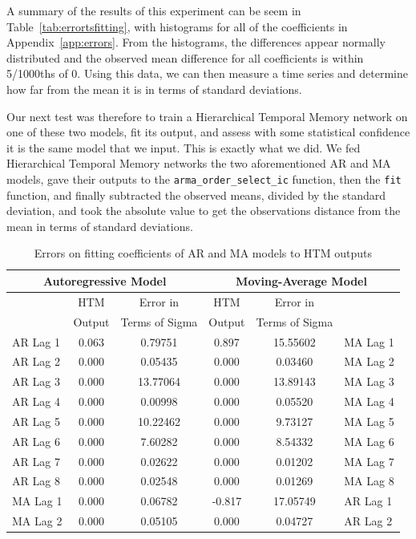 \documentclass[oneside,12pt,openany]{book}
\begin{document}
	A summary of the results of this experiment can be seem in Table~\ref{tab:errortsfitting}, with histograms for all of the coefficients in Appendix~\ref{app:errors}. From the histograms, the differences appear normally distributed and the observed mean difference for all coefficients is within 5/1000ths of 0. Using this data, we can then measure a time series and determine how far from the mean it is in terms of standard deviations. 
	
	Our next test was therefore to train a Hierarchical Temporal Memory network on one of these two models, fit its output, and assess with some statistical confidence it is the same model that we input. This is exactly what we did. We fed Hierarchical Temporal Memory networks the two aforementioned AR and MA models, gave their outputs to the \texttt{arma\_order\_select\_ic} function, then the \texttt{fit} function, and finally subtracted the observed means, divided by the standard deviation, and took the absolute value to get the observations distance from the mean in terms of standard deviations. 
		
	\begin{table}[!ht]
		\centering
		\begin{tabular}{|l|c|c|c|c|l|}
			\hline
			\multicolumn{3}{|c|}{Autoregressive Model} & \multicolumn{3}{c|}{Moving-Average Model} \\ \hline
			\cellcolor{black} & HTM & Error in & HTM & Error in & \cellcolor{black} \\
			\cellcolor{black} & Output & Terms of Sigma & Output & Terms of Sigma & \cellcolor{black} \\ \hline
			AR Lag 1 & 0.063 & 0.79751 & 0.897 & 15.55602 & MA Lag 1 \\ \hline
			AR Lag 2 & 0.000 & 0.05435 & 0.000 & 0.03460 & MA Lag 2 \\ \hline
			AR Lag 3 & 0.000 & 13.77064 & 0.000 & 13.89143 & MA Lag 3 \\ \hline
			AR Lag 4 & 0.000 & 0.00998 & 0.000 & 0.05520 & MA Lag 4 \\ \hline
			AR Lag 5 & 0.000 & 10.22462 & 0.000 & 9.73127 & MA Lag 5 \\ \hline
			AR Lag 6 & 0.000 & 7.60282 & 0.000 & 8.54332 & MA Lag 6 \\ \hline
			AR Lag 7 & 0.000 & 0.02622 & 0.000 & 0.01202 & MA Lag 7 \\ \hline
			AR Lag 8 & 0.000 & 0.02548 & 0.000 & 0.01269 & MA Lag 8 \\ \hline
			MA Lag 1 & 0.000 & 0.06782 & -0.817 & 17.05749 & AR Lag 1 \\ \hline
			MA Lag 2 & 0.000 & 0.05105 & 0.000 & 0.04727 & AR Lag 2 \\ \hline
		\end{tabular}
		\caption{Errors on fitting coefficients of AR and MA models to HTM outputs}
		\label{tab:HTMARMAError}
	\end{table}
	
\end{document}

